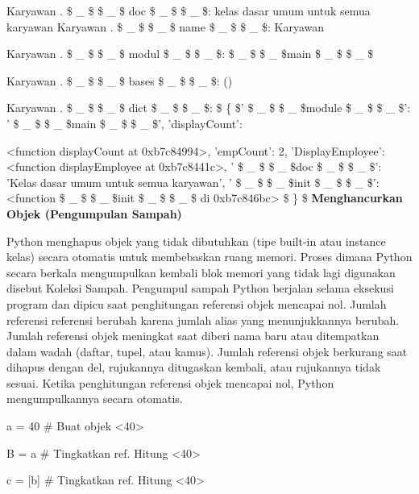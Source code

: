 \begin{12pt}
\begin{12pt}
\begin{12pt}
\begin{12pt}
\begin{12pt}
\begin{12pt}
\begin{12pt}
\begin{12pt}
\begin{12pt}
\begin{12pt}
\begin{12pt}
\begin{12pt}
\begin{12pt}
\begin{12pt}
\begin{12pt}
\begin{12pt}
\vspace{12pt}
\noindent 
Karyawan . \$  \_  \$ \$  \_  \$ doc \$  \_  \$ \$  \_  \$: kelas dasar umum untuk semua karyawan 
\noindent 
Karyawan . \$  \_  \$ \$  \_  \$ name \$  \_  \$ \$  \_  \$: Karyawan \par
\noindent 
Karyawan . \$  \_  \$ \$  \_  \$ modul \$  \_  \$ \$  \_  \$:  \$  \_  \$ \$  \_  \$main \$  \_  \$ \$  \_  \$ \par
\noindent 
Karyawan . \$  \_  \$ \$  \_  \$ bases \$  \_  \$ \$  \_  \$: () \par
\noindent 
Karyawan . \$  \_  \$ \$  \_  \$ dict \$  \_  \$ \$  \_  \$:  \$  \{  \$' \$  \_  \$ \$  \_  \$module \$  \_  \$ \$  \_  \$': ' \$  \_  \$ \$  \_  \$main \$  \_  \$ \$  \_  \$', 'displayCount': \par
\noindent 
<function displayCount at 0xb7c84994>, 'empCount': 2, 
\noindent 
'DisplayEmployee': <function displayEmployee at 0xb7c8441c>, 
\noindent 
' \$  \_  \$ \$  \_  \$doc \$  \_  \$ \$  \_  \$': 'Kelas dasar umum untuk semua karyawan', 
\noindent 
' \$  \_  \$ \$  \_  \$init \$  \_  \$ \$  \_  \$': <function  \$  \_  \$ \$  \_  \$init \$  \_  \$ \$  \_  \$ di 0xb7c846bc> \$  \}  \$ 
\vspace{12pt}
\noindent 
{\fontsize{14pt}{14pt}\selectfont \textbf{Menghancurkan Objek (Pengumpulan Sampah)} \\} \par
\vspace{12pt}
Python menghapus objek yang tidak dibutuhkan (tipe built-in atau instance kelas) secara otomatis untuk membebaskan ruang memori. Proses dimana Python secara berkala mengumpulkan kembali blok memori yang tidak lagi digunakan disebut Koleksi Sampah. Pengumpul sampah Python berjalan selama eksekusi program dan dipicu saat penghitungan referensi objek mencapai nol. Jumlah referensi referensi berubah karena jumlah alias yang menunjukkannya berubah. Jumlah referensi objek meningkat saat diberi nama baru atau ditempatkan dalam wadah (daftar, tupel, atau kamus). Jumlah referensi objek berkurang saat dihapus dengan del, rujukannya ditugaskan kembali, atau rujukannya tidak sesuai. Ketika penghitungan referensi objek mencapai nol, Python mengumpulkannya secara otomatis. \par
\vspace{12pt}
\noindent 
a = 40  $  \#  $ Buat objek <40> \par
\noindent 
B = a  $  \#  $ Tingkatkan ref. Hitung <40> \par
\noindent 
c = [b]  $  \#  $ Tingkatkan ref. Hitung <40> \par

\end{12pt}
\end{12pt}
\end{12pt}
\end{12pt}
\end{12pt}
\end{12pt}
\end{12pt}
\end{12pt}
\end{12pt}
\end{12pt}
\end{12pt}
\end{12pt}
\end{12pt}
\end{12pt}
\end{12pt}
\end{12pt}
